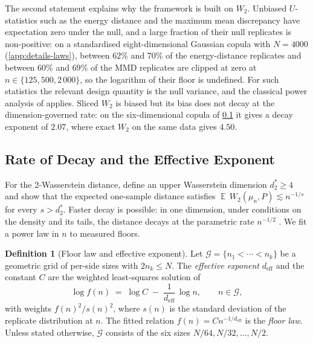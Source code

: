 \documentclass[twoside,11pt]{article}
\theoremstyle{plain}
\theoremstyle{definition}
\newtheorem{defn}{Definition}
\theoremstyle{remark}
\newcommand{\Wtwo}{\ensuremath{W_2}}
\newcommand{\deff}{\ensuremath{d_{\mathrm{eff}}}}
\DeclareMathOperator{\E}{\mathbb{E}}
\begin{document}
The second statement explains why the framework is built on $\Wtwo$.
Unbiased $U$-statistics such as the energy distance
\citep{baringhaus2004,szekely2013} and the maximum mean discrepancy
\citep{gretton2007,gretton2012,schrab2023} have expectation zero under the
null, and a large fraction of their null replicates is non-positive: on a
standardised eight-dimensional Gaussian copula with $N = 4000$
(\cref{app:details-laws}), between $62\%$ and $70\%$ of the energy-distance
replicates and between $60\%$ and $69\%$ of the MMD replicates are clipped
at zero at $n \in \{125, 500, 2\,000\}$, so the logarithm of their floor is
undefined. For such statistics the relevant design
quantity is the null variance, and the classical power analysis of
\citet{gretton2012} applies. Sliced $\Wtwo$ \citep{rabin2012,bonneel2015} is biased but its bias does not
decay at the dimension-governed rate: on the six-dimensional copula of
\cref{sec:floor-exponent} it gives a decay exponent of $2.07$, where exact
$\Wtwo$ on the same data gives $4.50$.

\subsection{Rate of Decay and the Effective Exponent}\label{sec:floor-exponent}

For the 2-Wasserstein distance, \citet{weedbach2019} define an upper
Wasserstein dimension $d^*_2 \geq 4$ and show that the expected one-sample
distance satisfies $\E\,\Wtwo(\mu_n, P) \lesssim n^{-1/s}$ for every
$s > d^*_2$. Faster decay is possible: in one dimension, under conditions on
the density and its tails, the distance decays at the parametric rate
$n^{-1/2}$ \citep{bobkov2019}. We fit a power law in $n$ to measured
floors.

\begin{defn}[Floor law and effective exponent]\label{def:exponent}
Let $\mathcal{G} = \{n_1 < \cdots < n_k\}$ be a geometric grid of per-side
sizes with $2n_k \leq N$. The \emph{effective exponent} $\deff$ and the
constant $C$ are the weighted least-squares solution of
\begin{equation}\label{eq:floorlaw}
  \log f(n) \;=\; \log C \;-\; \frac{1}{\deff}\, \log n ,
  \qquad n \in \mathcal{G},
\end{equation}
with weights $f(n)^2/s(n)^2$, where $s(n)$ is the standard deviation of
the replicate distribution at $n$. The fitted relation
$f(n) = C n^{-1/\deff}$ is the \emph{floor law}. Unless stated otherwise,
$\mathcal{G}$ consists of the six sizes $N/64, N/32, \dots, N/2$.
\end{defn}
\end{document}
